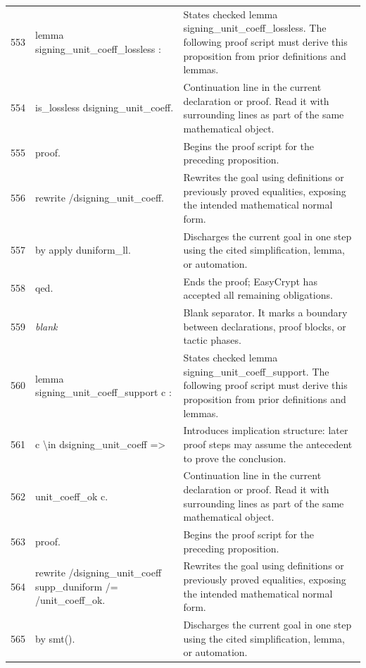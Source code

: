 \documentclass[10pt]{article}
\begin{document}
\begin{longtable}{r L{0.53\textwidth} L{0.37\textwidth}}
553 & {\ttfamily\scriptsize lemma signing\_unit\_coeff\_lossless :} & States checked lemma signing\_unit\_coeff\_lossless.  The following proof script must derive this proposition from prior definitions and lemmas. \\
554 & {\ttfamily\scriptsize   is\_lossless dsigning\_unit\_coeff.} & Continuation line in the current declaration or proof.  Read it with surrounding lines as part of the same mathematical object. \\
555 & {\ttfamily\scriptsize proof.} & Begins the proof script for the preceding proposition. \\
556 & {\ttfamily\scriptsize rewrite /dsigning\_unit\_coeff.} & Rewrites the goal using definitions or previously proved equalities, exposing the intended mathematical normal form. \\
557 & {\ttfamily\scriptsize by apply duniform\_ll.} & Discharges the current goal in one step using the cited simplification, lemma, or automation. \\
558 & {\ttfamily\scriptsize qed.} & Ends the proof; EasyCrypt has accepted all remaining obligations. \\
559 & {\ttfamily\scriptsize \emph{blank}} & Blank separator.  It marks a boundary between declarations, proof blocks, or tactic phases. \\
560 & {\ttfamily\scriptsize lemma signing\_unit\_coeff\_support c :} & States checked lemma signing\_unit\_coeff\_support.  The following proof script must derive this proposition from prior definitions and lemmas. \\
561 & {\ttfamily\scriptsize   c \textbackslash{}in dsigning\_unit\_coeff =>} & Introduces implication structure: later proof steps may assume the antecedent to prove the conclusion. \\
562 & {\ttfamily\scriptsize   unit\_coeff\_ok c.} & Continuation line in the current declaration or proof.  Read it with surrounding lines as part of the same mathematical object. \\
563 & {\ttfamily\scriptsize proof.} & Begins the proof script for the preceding proposition. \\
564 & {\ttfamily\scriptsize rewrite /dsigning\_unit\_coeff supp\_duniform /= /unit\_coeff\_ok.} & Rewrites the goal using definitions or previously proved equalities, exposing the intended mathematical normal form. \\
565 & {\ttfamily\scriptsize by smt().} & Discharges the current goal in one step using the cited simplification, lemma, or automation. \\

\end{longtable}
\end{document}
